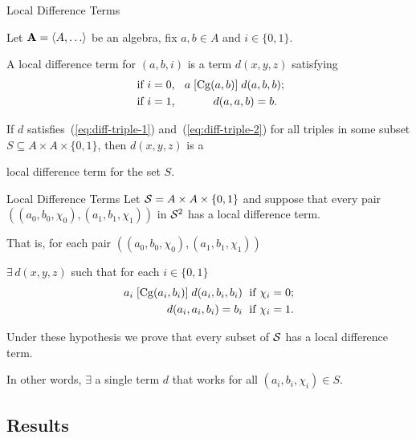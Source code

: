 \documentclass[12pt,xcolor=dvipsnames%
   ]{beamer}
\renewcommand{\defn}[1]{\alert{#1}}
\newcommand{\bigpause}{\pause\bigskip}
\newcommand{\medpause}{\pause\medskip}
\begin{document}
\begin{frame}{Local Difference Terms}

  Let $\bA=\< A, \dots\>$ be an algebra, fix $a, b \in A$ and
  $i \in \{0,1\}$.

  A \defn{local difference term for $(a,b,i)$} is a term $d(x,y,z)$ satisfying
  \begin{align}
    \text{ if $i=0$, } \; & \; a \mathrel{[\operatorname{Cg}(a,b)]} d(a,b,b); \label{eq:diff-triple-1}\\
    \text{ if $i=1$, } \; & \hskip1cm d(a,a,b) = b. \label{eq:diff-triple-2}
  \end{align}

  \bigpause
  If $d$ satisfies~(\ref{eq:diff-triple-1}) and~(\ref{eq:diff-triple-2}) for all triples
  in some subset $S\subseteq A \times A \times \{0,1\}$, then $d(x,y,z)$ is a

  \hskip1cm \defn{local difference term for the set $S$}.
\end{frame}


\begin{frame}{Local Difference Terms}
  Let 
  $\mathcal{S} = A \times A \times \{0,1\}$ and
  suppose that every pair
  $((a_0, b_0, \chi_0), (a_1, b_1, \chi_1))$
  in $\mathcal{S}^2$ has a local difference term.

  \bigpause
  That is, for each pair $((a_0, b_0, \chi_0), (a_1, b_1, \chi_1))$ 

  $\exists \, d(x,y,z)$ such that for each $i \in \{0,1\}$
  \begin{align}
    a_i \Comr{\Cg(a_i,b_i)} d(a_i,b_i,b_i) & \;
  \text{ if $\chi_i=0$;}  \label{eq:d-trip-i1}\\
  d(a_i,a_i,b_i) =b_i & \;
  \text{ if $\chi_i=1$.}\label{eq:d-trip-i2} %
  \end{align}
  
  \medpause
  Under these hypothesis we prove that every subset of $\mathcal{S}$
  has a local difference term.

  \vskip1mm
  In other words, $\exists$ a single term $d$ that works 
  for all $(a_i, b_i, \chi_i) \in S$.
\end{frame}

\subsection{Results}
\end{document}

